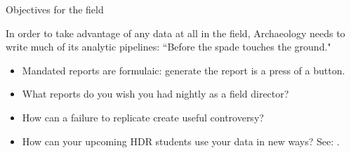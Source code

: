\documentclass[aspectratio=1610, 11pt]{beamer} %
\begin{document}
\begin{frame}{Objectives for the field}

In order to take advantage of any data at all in the field, Archaeology needs to write much of its analytic pipelines: ``Before the spade touches the ground."

\begin{itemize}[label=\textbullet]
\item Mandated reports are formulaic: generate the report is a press of a button.
\item What reports do you wish you had nightly as a field director?
\item How can a failure to replicate create useful controversy?
\item How can your upcoming HDR students use your data in new ways? See: \cite{Spring2018-kr}.
\end{itemize}

\end{frame}










\end{document}
